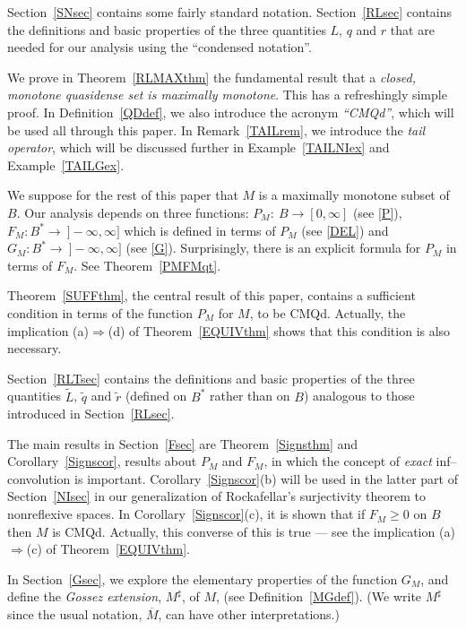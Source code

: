 \documentclass[letterpaper]{article}
\theoremstyle{plain}
\theoremstyle{definition}
\numberwithin{equation}{section}
\newcommand{\cmqd}{{CMQd}}
\newcommand{\lr}{\Longrightarrow}
\newcommand{\Lt}{{\wt L}}
\newcommand{\qt}{\wt q}
\newcommand{\rt}{\wt r}
\newcommand{\wt}{\widetilde}
\newcommand{\Cor}{Corollary~\ref}
\newcommand{\Def}{Definition~\ref}
\newcommand{\Ex}{Example~\ref}
\newcommand{\Rem}{Remark~\ref}
\newcommand{\Sec}{Section~\ref}
\newcommand{\Thm}{Theorem~\ref}
\begin{document}
\Sec{SNsec} contains some fairly standard notation. \Sec{RLsec} contains the definitions and basic properties of the three quantities $L$, $q$ and $r$ that are needed for our analysis using the ``condensed notation''.

We prove in  \Thm{RLMAXthm} the fundamental result that a {\em closed, monotone quasidense set is maximally monotone}.   This has a refreshingly simple proof.   In \Def{QDdef}, we also introduce the acronym {\em``\cmqd''}, which will be used all through this paper.   In \Rem{TAILrem}, we introduce the {\em tail operator}, which will be discussed further in \Ex{TAILNIex} and \Ex{TAILGex}.

We suppose for the rest of  this paper that $M$ is a maximally monotone subset of $B$.   Our analysis depends on three functions: $P_M\colon\ B \to [0,\infty]$ (see \eqref{P}), $F_M\colon B^* \to\ ]-\infty,\infty]$ which is defined in terms of $P_M$ \big(see \eqref{DEL}\big) and $G_M\colon B^* \to\ ]-\infty,\infty]$ \big(see \eqref{G}\big).   Surprisingly, there is an explicit formula for $P_M$ in terms of $F_M$.   See \Thm{PMFMqt}.     

\Thm{SUFFthm}, the central result of this paper, contains a sufficient condition in terms of the function $P_M$ for $M$, to be \cmqd.   Actually, the implication (a)$\lr$(d) of \Thm{EQUIVthm} shows that this condition is also necessary.

\Sec{RLTsec} contains the definitions and basic properties of the three quantities $\Lt$, $\qt$ and $\rt$ (defined on $B^*$ rather than on $B$) analogous to those introduced in \Sec{RLsec}.  

The main results in \Sec{Fsec} are \Thm{Signsthm} and \Cor{Signscor}, results about $P_M$ and $F_M$, in which the concept of {\em exact} inf--convolution is important.   \Cor{Signscor}(b) will be used in the latter part of \Sec{NIsec} in our generalization of Rockafellar's surjectivity theorem to nonreflexive spaces. In \Cor{Signscor}(c), it is shown that if $F_M \ge 0$ on $B$ then $M$ is \cmqd.   Actually, this converse of this is true --- see the implication (a)$\lr$(c) of \Thm{EQUIVthm}.

In \Sec{Gsec}, we explore the elementary properties of the function $G_M$, and define the {\em Gossez extension}, $M^\sharp$, of $M$, (see \Def{MGdef}).  \big(We write $M^\sharp$ since the usual notation, $\overline M$, can have other interpretations.\big)    
\end{document}
